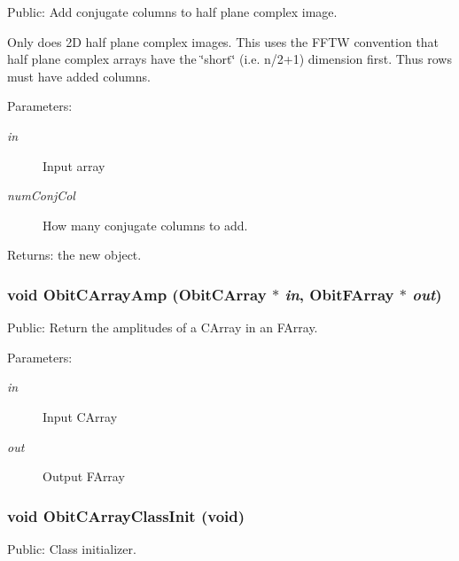 Public: Add conjugate columns to half plane complex image. 

Only does 2D half plane complex images. This uses the FFTW convention that half plane complex arrays have the \char`\"{}short\char`\"{} (i.e. n/2+1) dimension first. Thus rows must have added columns. \begin{Desc}
\item[Parameters:]
\begin{description}
\item[{\em in}]Input array \item[{\em num\-Conj\-Col}]How many conjugate columns to add. \end{description}
\end{Desc}
\begin{Desc}
\item[Returns:]the new object. \end{Desc}
\subsubsection{\setlength{\rightskip}{0pt plus 5cm}void Obit\-CArray\-Amp ({\bf Obit\-CArray} $\ast$ {\em in}, {\bf Obit\-FArray} $\ast$ {\em out})}\label{ObitCArray_8c_a36}


Public: Return the amplitudes of a CArray in an FArray. 

\begin{Desc}
\item[Parameters:]
\begin{description}
\item[{\em in}]Input CArray \item[{\em out}]Output FArray \end{description}
\end{Desc}
\subsubsection{\setlength{\rightskip}{0pt plus 5cm}void Obit\-CArray\-Class\-Init (void)}\label{ObitCArray_8c_a41}


Public: Class initializer. 

